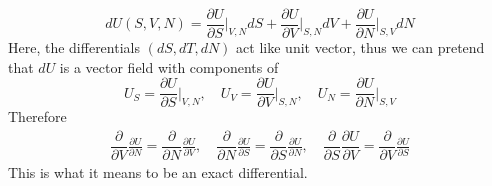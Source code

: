 \documentclass[../../../main.tex]{subfiles}
\begin{document}
\begin{equation*}
    dU(S,V,N)=\frac{\partial U}{\partial S}\bigg|_{V,N} dS + \frac{ \partial U}{\partial V}\bigg|_{S,N} dV+ \frac{\partial U}{\partial N}\bigg|_{S,V}dN
\end{equation*}
Here, the differentials $(dS,dT,dN)$ act like unit vector, thus we can pretend that $dU$ is a vector field with components of
\begin{equation*}
    U_S=\frac{\partial U}{\partial S}\bigg|_{V,N}, \quad
    U_V=\frac{ \partial U}{\partial V}\bigg|_{S,N},\quad
    U_N=\frac{\partial U}{\partial N}\bigg|_{S,V}
\end{equation*}
Therefore
\begin{align*}
    \dfrac{\partial }{\partial V} \frac{\partial U}{\partial N}  = \dfrac{\partial }{\partial N}\frac{ \partial U}{\partial V},\quad
    \dfrac{\partial }{\partial N}\frac{\partial U}{\partial S}=\dfrac{\partial }{\partial S}\frac{\partial U}{\partial N},\quad
    \dfrac{\partial }{\partial S}\dfrac{ \partial U}{\partial V}=\dfrac{\partial }{\partial V}\frac{\partial U}{\partial S}
\end{align*}
This is what it means to be an exact differential.
\end{document}
